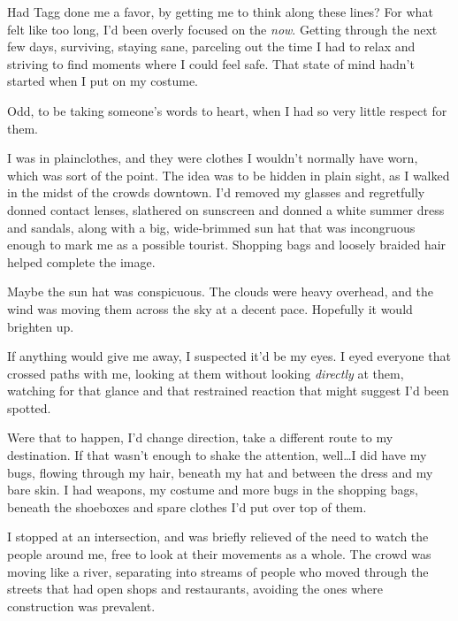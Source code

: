 





Had Tagg done me a favor, by getting me to think along these lines?  For what felt like too long, I'd been overly focused on the \emph{now}.  Getting through the next few days, surviving, staying sane, parceling out the time I had to relax and striving to find moments where I could feel safe.  That state of mind hadn't started when I put on my costume.



Odd, to be taking someone's words to heart, when I had so very little respect for them.



I was in plainclothes, and they were clothes I wouldn't normally have worn, which was sort of the point.  The idea was to be hidden in plain sight, as I walked in the midst of the crowds downtown.  I'd removed my glasses and regretfully donned contact lenses, slathered on sunscreen and donned a white summer dress and sandals, along with a big, wide-brimmed sun hat that was incongruous enough to mark me as a possible tourist.  Shopping bags and loosely braided hair helped complete the image.



Maybe the sun hat was conspicuous.  The clouds were heavy overhead, and the wind was moving them across the sky at a decent pace.  Hopefully it would brighten up.



If anything would give me away, I suspected it'd be my eyes.  I eyed everyone that crossed paths with me, looking at them without looking \emph{directly} at them, watching for that glance and that restrained reaction that might suggest I'd been spotted.



Were that to happen, I'd change direction, take a different route to my destination.  If that wasn't enough to shake the attention, well\ldots I did have my bugs, flowing through my hair, beneath my hat and between the dress and my bare skin.  I had weapons, my costume and more bugs in the shopping bags, beneath the shoeboxes and spare clothes I'd put over top of them.



I stopped at an intersection, and was briefly relieved of the need to watch the people around me, free to look at their movements as a whole.  The crowd was moving like a river, separating into streams of people who moved through the streets that had open shops and restaurants, avoiding the ones where construction was prevalent.



